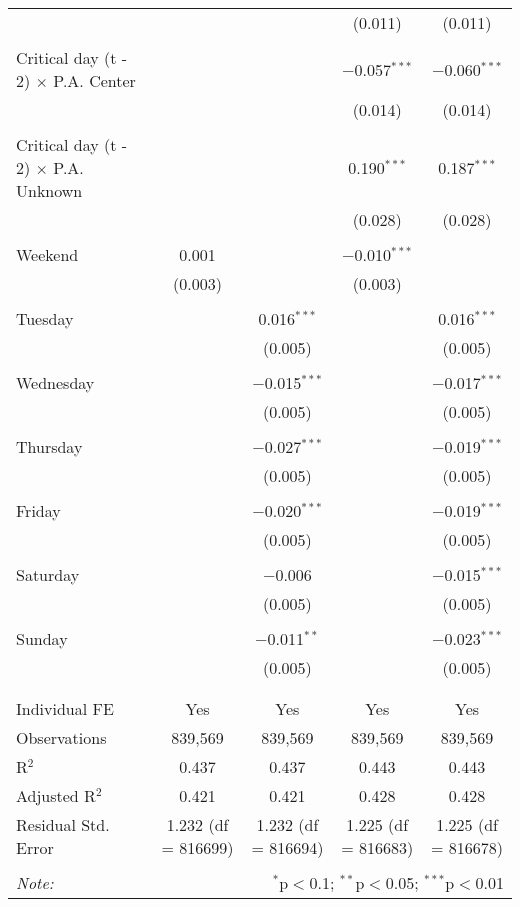\documentclass[
]{article}
\begin{document}
\begin{table}[!htbp]
{\begin{tabular}{@{\extracolsep{5pt}}lcccc}
  &  &  & (0.011) & (0.011) \\ 
  & & & & \\ 
 Critical day (t - 2) $\times$ P.A. Center &  &  & $-$0.057$^{***}$ & $-$0.060$^{***}$ \\ 
  &  &  & (0.014) & (0.014) \\ 
  & & & & \\ 
 Critical day (t - 2) $\times$ P.A. Unknown &  &  & 0.190$^{***}$ & 0.187$^{***}$ \\ 
  &  &  & (0.028) & (0.028) \\ 
  & & & & \\ 
 Weekend & 0.001 &  & $-$0.010$^{***}$ &  \\ 
  & (0.003) &  & (0.003) &  \\ 
  & & & & \\ 
 Tuesday &  & 0.016$^{***}$ &  & 0.016$^{***}$ \\ 
  &  & (0.005) &  & (0.005) \\ 
  & & & & \\ 
 Wednesday &  & $-$0.015$^{***}$ &  & $-$0.017$^{***}$ \\ 
  &  & (0.005) &  & (0.005) \\ 
  & & & & \\ 
 Thursday &  & $-$0.027$^{***}$ &  & $-$0.019$^{***}$ \\ 
  &  & (0.005) &  & (0.005) \\ 
  & & & & \\ 
 Friday &  & $-$0.020$^{***}$ &  & $-$0.019$^{***}$ \\ 
  &  & (0.005) &  & (0.005) \\ 
  & & & & \\ 
 Saturday &  & $-$0.006 &  & $-$0.015$^{***}$ \\ 
  &  & (0.005) &  & (0.005) \\ 
  & & & & \\ 
 Sunday &  & $-$0.011$^{**}$ &  & $-$0.023$^{***}$ \\ 
  &  & (0.005) &  & (0.005) \\ 
  & & & & \\ 
\hline \\[-1.8ex] 
Individual FE & Yes & Yes & Yes & Yes \\ 
Observations & 839,569 & 839,569 & 839,569 & 839,569 \\ 
R$^{2}$ & 0.437 & 0.437 & 0.443 & 0.443 \\ 
Adjusted R$^{2}$ & 0.421 & 0.421 & 0.428 & 0.428 \\ 
Residual Std. Error & 1.232 (df = 816699) & 1.232 (df = 816694) & 1.225 (df = 816683) & 1.225 (df = 816678) \\ 
\hline 
\hline \\[-1.8ex] 
\textit{Note:}  & \multicolumn{4}{r}{$^{*}$p$<$0.1; $^{**}$p$<$0.05; $^{***}$p$<$0.01} \\ 
\end{tabular}
} 
\end{table} 
\newpage
\end{document}
